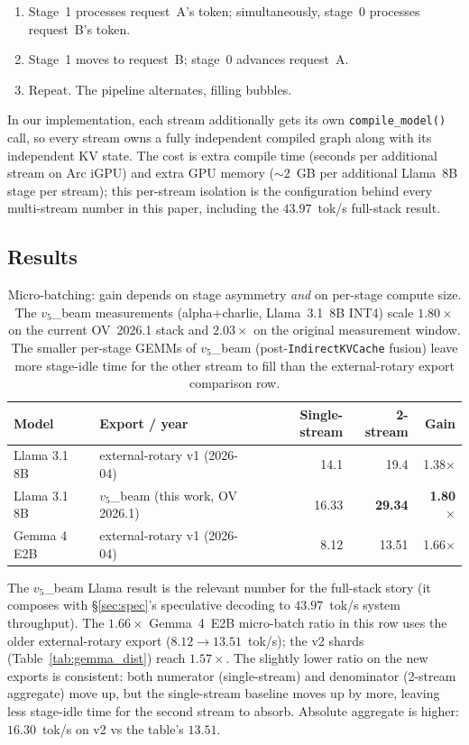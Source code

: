 \documentclass[11pt]{article}
\newcommand{\brk}{\discretionary{}{}{}}
\begin{document}
\begin{enumerate}[leftmargin=*]
  \item Stage~1 processes request~A's token; simultaneously, stage~0 processes request~B's token.
  \item Stage~1 moves to request~B; stage~0 advances request~A.
  \item Repeat. The pipeline alternates, filling bubbles.
\end{enumerate}

In our implementation, each stream additionally gets its own \texttt{compile\_\brk model()} call, so every stream owns a fully independent compiled graph along with its independent KV state. The cost is extra compile time (seconds per additional stream on Arc iGPU) and extra GPU memory (${\sim}2$~GB per additional Llama~8B stage per stream); this per-stream isolation is the configuration behind every multi-stream number in this paper, including the $43.97$~tok/s full-stack result.

\subsection{Results}

\begin{table}[ht]
\centering
\caption{Micro-batching: gain depends on stage asymmetry \emph{and} on per-stage compute size. The $v_5$\_beam measurements (alpha+charlie, Llama~3.1~8B INT4) scale $1.80\times$ on the current OV~2026.1 stack and $2.03\times$ on the original measurement window. The smaller per-stage GEMMs of $v_5$\_beam (post-\texttt{Indirect\brk KVCache} fusion) leave more stage-idle time for the other stream to fill than the external-rotary export comparison row.}
\label{tab:microbatch}
\begin{tabular}{@{}llrrr@{}}
\toprule
Model & Export / year & Single-stream & 2-stream & Gain \\
\midrule
Llama 3.1 8B & external-rotary v1 (2026-04) & 14.1 & 19.4 & 1.38$\times$ \\
Llama 3.1 8B & $v_5$\_beam (this work, OV 2026.1) & 16.33 & \textbf{29.34} & \textbf{1.80$\times$} \\
Gemma 4 E2B & external-rotary v1 (2026-04) & 8.12 & 13.51 & 1.66$\times$ \\
\bottomrule
\end{tabular}
\end{table}

The $v_5$\_beam Llama result is the relevant number for the full-stack story (it composes with \S\ref{sec:spec}'s speculative decoding to $43.97$~tok/s system throughput). The $1.66\times$ Gemma~4~E2B micro-batch ratio in this row uses the older external-rotary export ($8.12 \to 13.51$~tok/s); the v2 shards (Table~\ref{tab:gemma_dist}) reach $1.57\times$. The slightly lower ratio on the new exports is consistent: both numerator (single-stream) and denominator (2-stream aggregate) move up, but the single-stream baseline moves up by more, leaving less stage-idle time for the second stream to absorb. Absolute aggregate is higher: $16.30$~tok/s on v2 vs the table's $13.51$.
\end{document}
